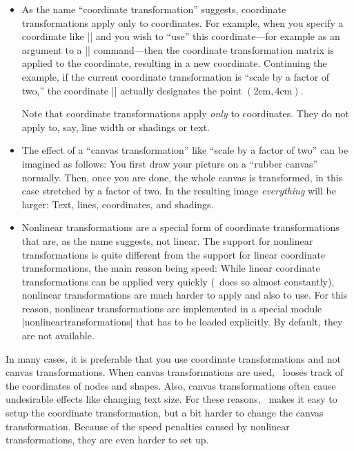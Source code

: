\begin{itemize}
\item
  As the name ``coordinate transformation'' suggests, coordinate
  transformations apply only to coordinates. For example, when you
  specify a coordinate like |\pgfpoint{1cm}{2cm}| and you wish to
  ``use'' this coordinate---for example as an argument to a
  |\pgfpathmoveto| command---then the coordinate transformation matrix
  is applied to the coordinate, resulting in a new
  coordinate. Continuing the example, if the current coordinate
  transformation is ``scale by a factor of two,'' the coordinate
  |\pgfpoint{1cm}{2cm}| actually designates the point
  $(2\mathrm{cm},4\mathrm{cm})$.

  Note that coordinate transformations apply \emph{only} to
  coordinates. They do not apply to, say, line width or shadings or
  text.
\item
  The effect of a ``canvas transformation'' like ``scale by a factor
  of two'' can be imagined as follows: You first draw your picture on
  a ``rubber canvas'' normally. Then, once you are done, the whole
  canvas is transformed, in this case stretched by a factor of
  two. In the resulting image \emph{everything} will be larger: Text,
  lines, coordinates, and shadings.
\item
  Nonlinear transformations are a special form of coordinate
  transformations that are, as the name suggests, not linear. The
  support for nonlinear transformations is quite different from the
  support for linear coordinate transformations, the main reason being
  speed: While linear coordinate transformations can be applied very
  quickly (\pgfname\ does so almost constantly), nonlinear
  transformations are much harder to apply and also to use. For this
  reason, nonlinear transformations are implemented in a special
  module |nonlineartransformations| that has to be loaded
  explicitly. By default, they are not available.
\end{itemize}

In many cases, it is preferable that you use coordinate
transformations and not canvas transformations. When canvas
transformations are used, \pgfname\ looses track of the coordinates of
nodes and shapes. Also, canvas transformations often cause undesirable
effects like changing text size. For these reasons, \pgfname\ makes it
easy to setup the coordinate transformation, but a bit harder to
change the canvas transformation. Because of the speed penalties
caused by nonlinear transformations, they are even harder to set up.


